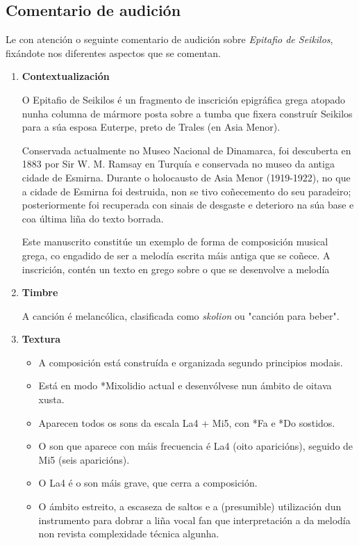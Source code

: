 %

\subsection*{Comentario de audición}\label{seikilos-comentado}
Le con atención o seguinte comentario de audición sobre \textit{Epitafio de Seikilos}, fixándote nos diferentes aspectos que se comentan.
%
   \begin{enumerate}[1.-]

       \item \textbf{Contextualización}
       \par
O Epitafio de Seikilos é un fragmento de inscrición epigráfica grega atopado nunha columna de mármore posta sobre a tumba que fixera construír Seikilos para a súa esposa Euterpe, preto de Trales (en Asia Menor).
\par
Conservada actualmente no Museo Nacional de Dinamarca, foi descuberta en 1883 por Sir W. M. Ramsay en Turquía e conservada no museo da antiga cidade de Esmirna. Durante o holocausto de Asia Menor (1919-1922), no que a cidade de Esmirna foi destruida, non se tivo coñecemento do seu paradeiro; posteriormente foi recuperada con sinais de desgaste e deterioro na súa base e coa última liña do texto borrada.
\par
Este manuscrito constitúe un exemplo de forma de composición musical grega, co engadido de ser a melodía escrita máis antiga que se coñece. A inscrición, contén un texto en grego sobre o que se desenvolve a melodía

   \item \textbf{Timbre} \par
A canción é melancólica, clasificada como \textit{skolion} ou "canción para beber".

    \item \textbf{Textura} \par
    \begin{itemize}
        \item 
        A composición está construída e organizada segundo principios modais.
        \item 
        Está en modo *Mixolidio actual e desenvólvese nun ámbito de oitava xusta. 
        \item
        Aparecen todos os sons da escala La4 + Mi5, con *Fa e *Do sostidos.
        \item
        O son que aparece con máis frecuencia é La4 (oito aparicións), seguido de Mi5 (seis aparicións). 
        \item
        O La4 é o son máis grave, que cerra a composición. 
        \item 
        O ámbito estreito, a escaseza de saltos e a (presumible) utilización dun instrumento para dobrar a liña vocal fan que interpretación a da melodía non revista complexidade técnica algunha.
    \end{itemize}


\end{enumerate}
